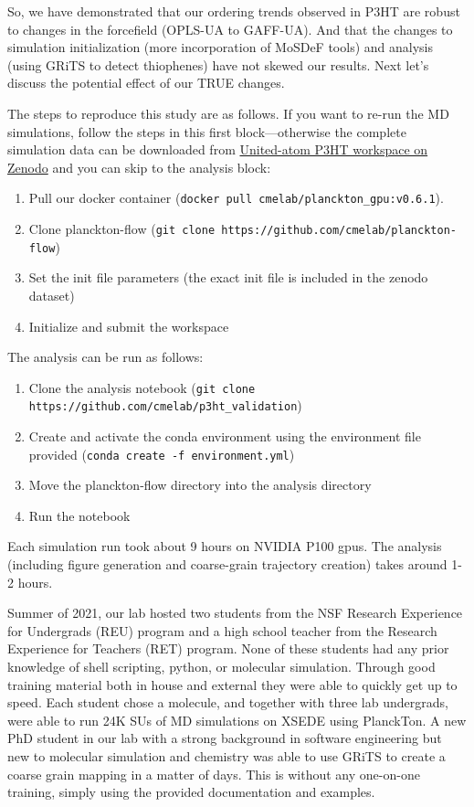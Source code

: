 So, we have demonstrated that our ordering trends observed in P3HT are robust to changes in the forcefield (OPLS-UA to GAFF-UA). And that the changes to simulation initialization (more incorporation of MoSDeF tools) and analysis (using GRiTS to detect thiophenes) have not skewed our results. Next let's discuss the potential effect of our TRUE changes.

The steps to reproduce this study are as follows.
If you want to re-run the MD simulations, follow the steps in this first block---otherwise the complete simulation data can be downloaded from \href{https://zenodo.org/record/5911940}{United-atom P3HT workspace on Zenodo} and you can skip to the analysis block:
\begin{enumerate}
    \item Pull our docker container (\lstinline{docker pull cmelab/planckton_gpu:v0.6.1}).
    \item Clone planckton-flow (\lstinline{git clone https://github.com/cmelab/planckton-flow})
    \item Set the init file parameters (the exact init file is included in the zenodo dataset)
    \item Initialize and submit the workspace
\end{enumerate}
The analysis can be run as follows:
\begin{enumerate}
    \item Clone the analysis notebook (\lstinline{git clone https://github.com/cmelab/p3ht_validation})
    \item Create and activate the conda environment using the environment file provided (\lstinline{conda create -f environment.yml})
    \item Move the planckton-flow directory into the analysis directory
    \item Run the notebook
\end{enumerate}

Each simulation run took about 9 hours on NVIDIA P100 gpus. The analysis (including figure generation and coarse-grain trajectory creation) takes around 1-2 hours.

Summer of 2021, our lab hosted two students from the NSF Research Experience for Undergrads (REU) program and a high school teacher from the Research Experience for Teachers (RET) program. None of these students had any prior knowledge of shell scripting, python, or molecular simulation. Through good training material both in house and external they were able to quickly get up to speed. Each student chose a molecule, and together with three lab undergrads, were able to run 24K SUs of MD simulations on XSEDE using PlanckTon. 
A new PhD student in our lab with a strong background in software engineering but new to molecular simulation and chemistry was able to use GRiTS to create a coarse grain mapping in a matter of days. This is without any one-on-one training, simply using the provided documentation and examples.


